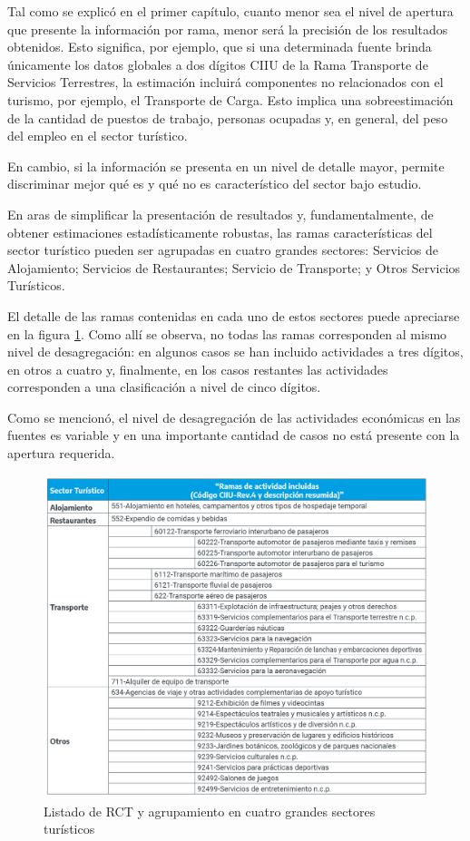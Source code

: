 \documentclass[
  openany]{book}
\begin{document}
Tal como se explicó en el primer capítulo, cuanto menor sea el nivel de apertura que presente la información por rama, menor será la precisión de los resultados obtenidos.
Esto significa, por ejemplo, que si una determinada fuente brinda únicamente los datos globales a dos dígitos CIIU de la Rama Transporte de Servicios Terrestres, la estimación incluirá componentes no relacionados con el turismo, por ejemplo, el Transporte de Carga.
Esto implica una sobreestimación de la cantidad de puestos de trabajo, personas ocupadas y, en general, del peso del empleo en el sector turístico.

En cambio, si la información se presenta en un nivel de detalle mayor, permite discriminar mejor qué es y qué no es característico del sector bajo estudio.

En aras de simplificar la presentación de resultados y, fundamentalmente, de obtener estimaciones estadísticamente robustas, las ramas características del sector turístico pueden ser agrupadas en cuatro grandes sectores: Servicios de Alojamiento; Servicios de Restaurantes; Servicio de Transporte; y Otros Servicios Turísticos.

El detalle de las ramas contenidas en cada uno de estos sectores puede apreciarse en la figura \ref{fig:empleofuentes4}. Como allí se observa, no todas las ramas corresponden al mismo nivel de desagregación: en algunos casos se han incluido actividades a tres dígitos, en otros a cuatro y, finalmente, en los casos restantes las actividades corresponden a una clasificación a nivel de cinco dígitos.

Como se mencionó, el nivel de desagregación de las actividades económicas en las fuentes es variable y en una importante cantidad de casos no está presente con la apertura requerida.

\begin{figure}

{\centering \includegraphics[width=1\linewidth]{imagenes/figura3.4} 

}

\caption{Listado de RCT y agrupamiento en cuatro grandes sectores turísticos}\label{fig:empleofuentes4}
\end{figure}
\end{document}

